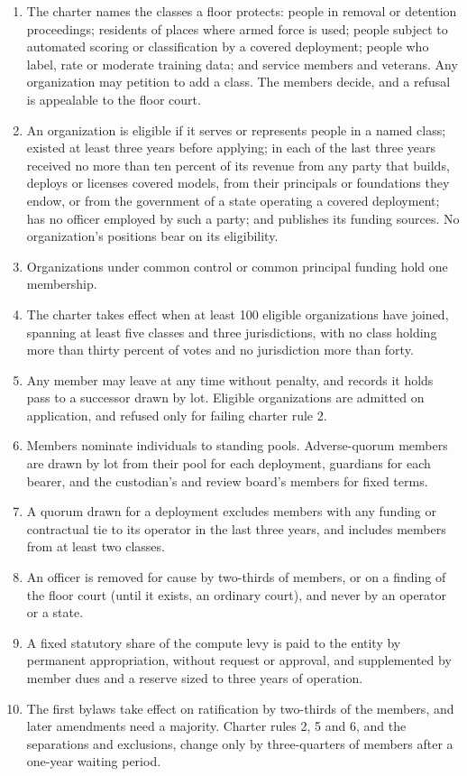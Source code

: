 \begin{enumerate}
\item[1.] The charter names the classes a floor protects: people in removal or detention proceedings; residents of places where armed force is used; people subject to automated scoring or classification by a covered deployment; people who label, rate or moderate training data; and service members and veterans. Any organization may petition to add a class. The members decide, and a refusal is appealable to the floor court.
\item[2.] An organization is eligible if it serves or represents people in a named class; existed at least three years before applying; in each of the last three years received no more than ten percent of its revenue from any party that builds, deploys or licenses covered models, from their principals or foundations they endow, or from the government of a state operating a covered deployment; has no officer employed by such a party; and publishes its funding sources. No organization's positions bear on its eligibility.
\item[3.] Organizations under common control or common principal funding hold one membership.
\item[4.] The charter takes effect when at least 100 eligible organizations have joined, spanning at least five classes and three jurisdictions, with no class holding more than thirty percent of votes and no jurisdiction more than forty.
\item[5.] Any member may leave at any time without penalty, and records it holds pass to a successor drawn by lot. Eligible organizations are admitted on application, and refused only for failing charter rule 2.
\item[6.] Members nominate individuals to standing pools. Adverse-quorum members are drawn by lot from their pool for each deployment, guardians for each bearer, and the custodian's and review board's members for fixed terms.
\item[7.] A quorum drawn for a deployment excludes members with any funding or contractual tie to its operator in the last three years, and includes members from at least two classes.
\item[8.] An officer is removed for cause by two-thirds of members, or on a finding of the floor court (until it exists, an ordinary court), and never by an operator or a state.
\item[9.] A fixed statutory share of the compute levy is paid to the entity by permanent appropriation, without request or approval, and supplemented by member dues and a reserve sized to three years of operation.
\item[10.] The first bylaws take effect on ratification by two-thirds of the members, and later amendments need a majority. Charter rules 2, 5 and 6, and the separations and exclusions, change only by three-quarters of members after a one-year waiting period.
\end{enumerate}

